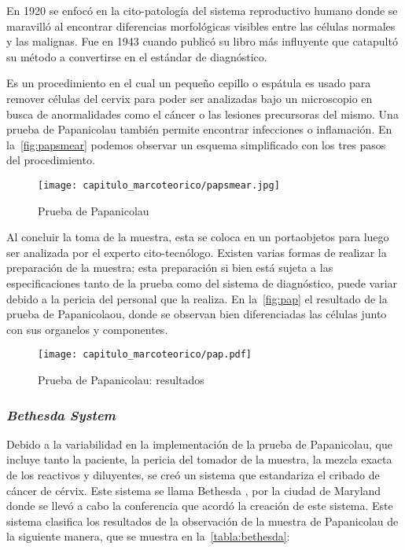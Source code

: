 En 1920 se enfocó en la cito-patología del sistema reproductivo humano donde se
maravilló al encontrar diferencias morfológicas visibles entre las células
normales y las malignas. Fue en 1943 cuando publicó su libro más influyente que
catapultó su método a convertirse en el estándar de diagnóstico.~\cite{Tan2015}

Es un procedimiento en el cual un pequeño cepillo o espátula es usado para
remover células del cervix para poder ser analizadas bajo un microscopio en
busca de anormalidades como el cáncer o las lesiones precursoras del mismo. Una
prueba de Papanicolau también permite encontrar infecciones o inflamación. En
la~\autoref{fig:papsmear} podemos observar un esquema simplificado con los tres pasos
del procedimiento.~\cite{NationalCancerInstitutea}
\begin{figure}[H]
    \centering
    \texttt{[image: capitulo\_marcoteorico/papsmear.jpg]}
    \caption{Prueba de Papanicolau}\label{fig:papsmear}
\end{figure}

Al concluir la toma de la muestra, esta se coloca en un portaobjetos para luego
ser analizada por el experto cito-tecnólogo. Existen varias formas de realizar
la preparación de la muestra; esta preparación si bien está sujeta a las
especificaciones tanto de la prueba como del sistema de diagnóstico, puede
variar debido a la pericia del personal que la realiza. En la~\autoref{fig:pap}
el resultado de la prueba de Papanicolaou, donde se observan bien diferenciadas
las células junto con sus organelos y componentes.

\begin{figure}[H]
    \centering
    \texttt{[image: capitulo\_marcoteorico/pap.pdf]}
    \caption{Prueba de Papanicolau: resultados}\label{fig:pap}
\end{figure}

\subsubsection{\emph{Bethesda System}}

Debido a la variabilidad en la implementación de la prueba de Papanicolau, que
incluye tanto la paciente, la pericia del tomador de la muestra, la mezcla
exacta de los reactivos y diluyentes, se creó un sistema que estandariza el
cribado de cáncer de cérvix. Este sistema se llama Bethesda , por la ciudad de Maryland donde se llevó a cabo la conferencia
que acordó la creación de este sistema. Este sistema clasifica los resultados de
la observación de la muestra de Papanicolau de la siguiente manera, que se
muestra en la~\autoref{tabla:bethesda}:

